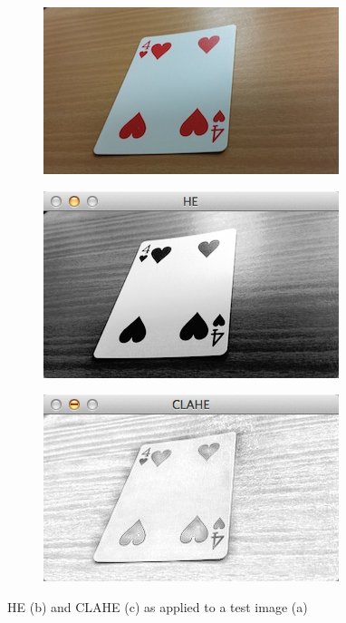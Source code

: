 \documentclass[a4paper,12pt,notitlepage]{article}
\begin{document}
			\begin{figure}[H]
				\centering
				\begin{subfigure}[b]{0.5\textwidth}
					\centering
					\includegraphics[width=\textwidth]{pers2}
					\caption{}
				\end{subfigure}
			\end{figure}
			\begin{figure}[H]
				\ContinuedFloat
				\centering
				\begin{subfigure}[b]{0.4\textwidth}
					\centering
					\includegraphics[width=\textwidth]{he}
					\caption{}
				\end{subfigure}
				\qquad
				\begin{subfigure}[b]{0.4\textwidth}
					\centering
					\includegraphics[width=\textwidth]{clahe}
					\caption{}
				\end{subfigure}
				\caption{HE (b) and CLAHE (c) as applied to a test image (a)}
				\label{fig:clahe}
			\end{figure}
\end{document}
